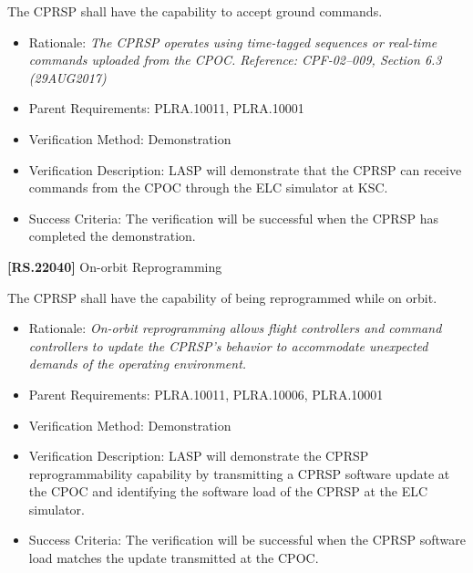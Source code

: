 \documentclass[12pt,oneside,oldfontcommands]{memoir}
\begin{document}
The \gls{CPRSP} shall have the capability to accept ground commands.

\begin{itemize}
\item{} Rationale: \emph{The CPRSP operates using time-tagged sequences or real-time commands uploaded from the CPOC. Reference: CPF-02--009, Section 6.3 (29AUG2017)}

\item{} Parent Requirements: PLRA.10011, PLRA.10001

\item{} Verification Method: Demonstration

\item{} Verification Description: \gls{LASP} will demonstrate that the \gls{CPRSP} can receive commands from the \gls{CPOC} through the \gls{ELC} simulator at \gls{KSC}.

\item{} Success Criteria: The verification will be successful when the \gls{CPRSP} has completed the \gls{demonstration}.

\end{itemize}

\textbf{[RS.22040]} On-orbit Reprogramming

The \gls{CPRSP} shall have the capability of being reprogrammed while on orbit.

\begin{itemize}
\item{} Rationale: \emph{On-orbit reprogramming allows flight controllers and command controllers to update the CPRSP's behavior to accommodate unexpected demands of the operating environment.}

\item{} Parent Requirements: PLRA.10011, PLRA.10006, PLRA.10001

\item{} Verification Method: Demonstration

\item{} Verification Description: \gls{LASP} will demonstrate the \gls{CPRSP} reprogrammability capability by transmitting a \gls{CPRSP} software update at the \gls{CPOC} and identifying the software load of the \gls{CPRSP} at the \gls{ELC} simulator.

\item{} Success Criteria: The verification will be successful when the \gls{CPRSP} software load matches the update transmitted at the \gls{CPOC}.

\end{itemize}
\end{document}
